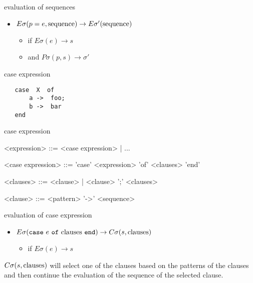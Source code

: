 \begin{frame}{evaluation of sequences}

\begin{itemize}
  \pause \item $E\sigma(p = e, {\rm sequence}) \rightarrow E\sigma'({\rm sequence})$ 
     \begin{itemize} 
       \pause \item if $E\sigma(e) \rightarrow s$
       \pause \item and $P\sigma(p, s) \rightarrow \sigma'$
     \end{itemize}
\end{itemize}

\pause\vspace{20pt}{\em First evaluate the pattern matching expression, if it succeeds then continue with the new environment.}
\end{frame}



\begin{frame}[fragile]{case expression}

\begin{verbatim}
   case  X  of 
       a ->  foo;
       b ->  bar
   end
\end{verbatim}

\end{frame}

\begin{frame}{case expression}

\begin{grammar}
     <expression> ::=  <case expression> | ...  

     <case expression> ::= 'case' <expression> 'of' <clauses>  'end' 

     <clauses> ::=   <clause> | <clause> ';' <clauses>

     <clause> ::=  <pattern> '->' <sequence>
\end{grammar}
\end{frame}

\begin{frame}{evaluation of case expression}
 
  \begin{itemize}
  \item $E\sigma({\tt case}\ e \ {\tt of}\ {\rm clauses} \ {\tt end}) \rightarrow C\sigma(s, {\rm clauses})$  \pause 
    \begin{itemize}
    \item if $E\sigma(e) \rightarrow s$
    \end{itemize}
       
  \end{itemize}


 \vspace{20pt}\pause $C\sigma(s, {\rm clauses})$ will select one of
 the clauses based on the patterns of the clauses and then continue the
 evaluation of the sequence of the selected clause.
\end{frame}

